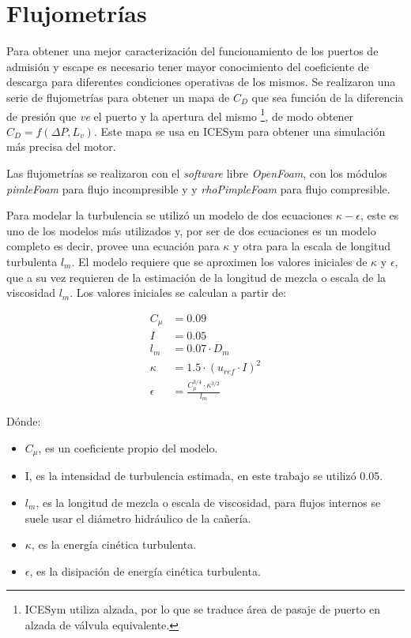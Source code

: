 \chapter{Flujometrías}
%
%
Para obtener una mejor caracterización del funcionamiento de los puertos de
admisión y escape es necesario tener mayor conocimiento del coeficiente de
descarga para diferentes condiciones operativas de los mismos.
%
Se realizaron una serie de flujometrías para obtener un mapa de $C_D$ que sea
función de la diferencia de presión que \emph{ve} el puerto y la apertura del
mismo \footnote{ICESym utiliza alzada, por lo que se traduce área de pasaje de
puerto en alzada de válvula equivalente.}, de modo obtener $C_D = f(\Delta P,L_v)$.
%
Este mapa se usa en ICESym para obtener una simulación más precisa del motor.

Las flujometrías se realizaron con el \emph{software} libre \emph{OpenFoam}, con
los módulos \emph{pimleFoam} para flujo incompresible y y \emph{rhoPimpleFoam}
para flujo compresible.

Para modelar la turbulencia se utilizó un modelo de dos ecuaciones
\emph{$\kappa-\epsilon$}\cite{wilcox}, este es uno de los modelos más utilizados
y, por ser de dos ecuaciones es un modelo completo es decir, provee una ecuación
para $\kappa$ y otra para la escala de longitud turbulenta $l_m$.
%
El modelo requiere que se aproximen los valores iniciales de $\kappa$ y
$\epsilon$, que a su vez requieren de la estimación de la longitud de mezcla o
escala de la viscosidad $l_m$.
%
Los valores iniciales se calculan a partir de:

\begin{align}
    C_{\mu}  &= 0.09 \\
    I        &= 0.05 \\
    l_m      &= 0.07 \cdot D_m \\
    \kappa   &= 1.5 \cdot \left( u_{ref} \cdot I \right) ^ 2 \\
    \epsilon &= \frac{C_\mu ^{3/4} \cdot \kappa ^{3/2}} {l_m}
\end{align}

Dónde:
%
\begin{itemize}
    \item $C_{\mu}$, es un coeficiente propio del modelo.
    \item I, es la intensidad de turbulencia estimada, en este trabajo se utilizó 0.05.
    \item $l_m$, es la longitud de mezcla o escala de viscosidad,
     para flujos internos se suele usar el diámetro hidráulico de la cañería.
    \item $\kappa$, es la energía cinética turbulenta.
    \item $\epsilon$, es la disipación de energía cinética turbulenta.
\end{itemize}

